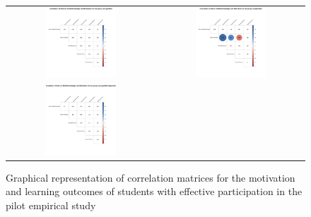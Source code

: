 \begin{figure}[htb]
 \caption{Graphical representation of correlation matrices for the motivation and learning outcomes of students with effective participation in the pilot empirical study}
 \label{fig:effective-correlation-matrices-pilot-study}
 \centering
 \begin{tabular}{cc}
 \includegraphics[width=0.5\textwidth]{images/chap-evaluation/corr-effective-pilot/non-gamified1.png}&
 \includegraphics[width=0.5\textwidth]{images/chap-evaluation/corr-effective-pilot/ont-gamified1.png}\\
 \includegraphics[width=0.5\textwidth]{images/chap-evaluation/corr-effective-pilot/non-gamifiedApprentice1.png}&

\end{tabular}
\end{figure}
